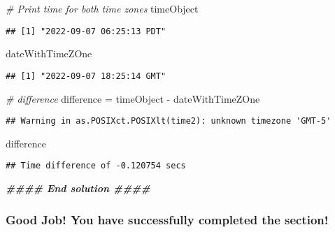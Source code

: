 \documentclass[
]{article}
\newenvironment{Shaded}{\begin{snugshade}}{\end{snugshade}}
\newcommand{\CommentTok}[1]{\textcolor[rgb]{0.56,0.35,0.01}{\textit{#1}}}
\newcommand{\DocumentationTok}[1]{\textcolor[rgb]{0.56,0.35,0.01}{\textbf{\textit{#1}}}}
\newcommand{\NormalTok}[1]{#1}
\newcommand{\OtherTok}[1]{\textcolor[rgb]{0.56,0.35,0.01}{#1}}
\newcommand{\SpecialCharTok}[1]{\textcolor[rgb]{0.00,0.00,0.00}{#1}}
\begin{document}
\begin{Shaded}
\begin{Highlighting}[]
\CommentTok{\# Print time for both time zones}
\NormalTok{timeObject}
\end{Highlighting}
\end{Shaded}

\begin{verbatim}
## [1] "2022-09-07 06:25:13 PDT"
\end{verbatim}

\begin{Shaded}
\begin{Highlighting}[]
\NormalTok{dateWithTimeZOne}
\end{Highlighting}
\end{Shaded}

\begin{verbatim}
## [1] "2022-09-07 18:25:14 GMT"
\end{verbatim}

\begin{Shaded}
\begin{Highlighting}[]
\CommentTok{\# difference}
\NormalTok{difference }\OtherTok{=}\NormalTok{ timeObject }\SpecialCharTok{{-}}\NormalTok{ dateWithTimeZOne}
\end{Highlighting}
\end{Shaded}

\begin{verbatim}
## Warning in as.POSIXct.POSIXlt(time2): unknown timezone 'GMT-5'
\end{verbatim}

\begin{Shaded}
\begin{Highlighting}[]
\NormalTok{difference}
\end{Highlighting}
\end{Shaded}

\begin{verbatim}
## Time difference of -0.120754 secs
\end{verbatim}

\begin{Shaded}
\begin{Highlighting}[]
\DocumentationTok{\#\#\#\# End solution \#\#\#\#}
\end{Highlighting}
\end{Shaded}

\hypertarget{good-job-you-have-successfully-completed-the-section-4}{%
\subsubsection{Good Job! You have successfully completed the
section!}\label{good-job-you-have-successfully-completed-the-section-4}}
\end{document}
